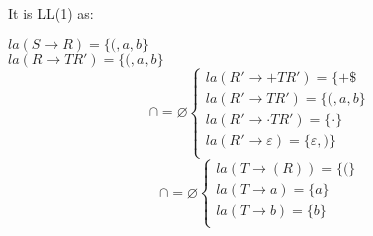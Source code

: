It is LL(1) as:
\begin{center}
    $la(S \rightarrow R) = \{(, a, b\}$ \\
    $la(R \rightarrow TR') = \{(, a, b\}$ \\
    \begin{equation}
      \cap = \varnothing
      \begin{cases}
        la(R' \rightarrow +TR') = \{+\$ \\
        la(R' \rightarrow TR') = \{(, a, b\} \\
        la(R' \rightarrow \cdot TR') = \{\cdot\} \\
        la(R' \rightarrow \varepsilon) = \{ \varepsilon, )\} \\
    \end{cases}  
    \end{equation}
    \begin{equation}
        \cap = \varnothing
        \begin{cases}
            la(T \rightarrow (R)) = \{(\} \\
            la(T \rightarrow a) = \{a\} \\
            la(T \rightarrow b) = \{b\} \\  
        \end{cases}
    \end{equation}
\end{center}


